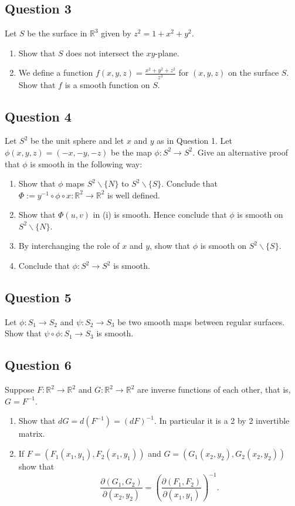 \documentclass[12pt, a4paper]{article}
\newcommand{\R}{\mathbb{R}}
\begin{document}
\subsection*{Question 3}
Let $S$ be the surface in $\R^{3}$ given by $z^{2}=1+x^{2}+y^{2}$.
\begin{enumerate}[label=(\roman*)]
    \item Show that $S$ does not intersect the $xy$-plane.
    \item We define a function $f(x,y,z)=\frac{x^{2}+y^{2}+z^{2}}{z^{3}}$ for $(x,y,z)$ on the surface $S$. Show that $f$ is a smooth function on $S$.
\end{enumerate}
\newpage

\subsection*{Question 4}
Let $S^{2}$ be the unit sphere and let $x$ and $y$ as in Question 1. Let $\phi(x,y,z)=(-x,-y,-z)$ be the map $\phi:S^{2}\rightarrow S^{2}$. Give an alternative proof that $\phi$ is smooth in the following way:
\begin{enumerate}[label=(\roman*)]
    \item Show that $\phi$ maps $S^{2}\backslash\{N\}$ to $S^{2}\backslash\{S\}$. Conclude that $\Phi:=y^{-1}\circ\phi\circ x:\R^{2}\rightarrow\R^{2}$ is well defined.
    \item Show that $\Phi(u,v)$ in (i) is smooth. Hence conclude that $\phi$ is smooth on $S^{2}\backslash\{N\}$.
    \item By interchanging the role of $x$ and $y$, show that $\phi$ is smooth on $S^{2}\backslash\{S\}$.
    \item Conclude that $\phi : S^{2}\rightarrow S^{2}$ is smooth.
\end{enumerate}
\newpage

\subsection*{Question 5}
Let $\phi : S_{1}\rightarrow S_{2}$ and $\psi : S_{2}\rightarrow S_{3}$ be two smooth maps between regular surfaces. Show that $\psi\circ\phi : S_{1}\rightarrow S_{3}$ is smooth.
\newpage

\subsection*{Question 6}
Suppose $F:\R^{2}\rightarrow\R^{2}$ and $G:\R^{2}\rightarrow\R^{2}$ are inverse functions of each other, that is, $G=F^{-1}$.
\begin{enumerate}[label=(\roman*)]
    \item Show that $dG=d(F^{-1})=(dF)^{-1}$. In particular it is a 2 by 2 invertible matrix.
    \item If $F=(F_{1}(x_{1},y_{1}),F_{2}(x_{1},y_{1}))$ and $G=(G_{1}(x_{2},y_{2}),G_{2}(x_{2},y_{2}))$ show that
    \[ \frac{\partial(G_{1},G_{2})}{\partial(x_{2},y_{2})}=\left(\frac{\partial(F_{1},F_{2})}{\partial(x_{1},y_{1})}\right)^{-1}. \]
\end{enumerate}
\newpage
\end{document}
